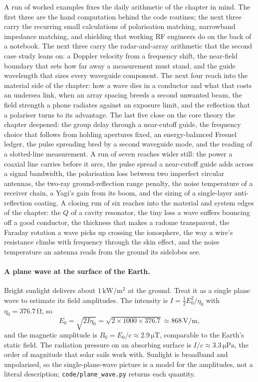 A run of worked examples fixes the daily arithmetic of the chapter in
mind. The first three are the hand computation behind the code routines;
the next three carry the recurring small calculations of polarisation
matching, narrowband impedance matching, and shielding that working RF
engineers do on the back of a notebook. The next three carry the
radar-and-array arithmetic that the second case study leans on: a
Doppler velocity from a frequency shift, the near-field boundary that
sets how far away a measurement must stand, and the guide wavelength
that sizes every waveguide component. The next four reach into the
material side of the chapter: how a wave dies in a conductor and what
that costs an undersea link, when an array spacing breeds a second
unwanted beam, the field strength a phone radiates against an exposure
limit, and the reflection that a polariser turns to its advantage. The
last five close on the core theory the chapter deepened: the group delay
through a near-cutoff guide, the frequency choice that follows from
holding apertures fixed, an energy-balanced Fresnel ledger, the pulse
spreading bred by a second waveguide mode, and the reading of a
slotted-line measurement. A run of seven reaches wider still: the
power a coaxial line carries before it arcs, the pulse spread a near-cutoff
guide adds across a signal bandwidth, the polarisation loss between two
imperfect circular antennas, the two-ray ground-reflection range penalty,
the noise temperature of a receiver chain, a Yagi's gain from its boom, and
the sizing of a single-layer anti-reflection coating. A closing run of six
reaches into the material and system edges of the chapter: the $Q$ of a
cavity resonator, the tiny loss a wave suffers bouncing off a good
conductor, the thickness that makes a radome transparent, the Faraday
rotation a wave picks up crossing the ionosphere, the way a wire's
resistance climbs with frequency through the skin effect, and the noise
temperature an antenna reads from the ground its sidelobes see.

\paragraph{A plane wave at the surface of the Earth.}
Bright sunlight delivers about $1\,\si{\kilo\watt\per\meter\squared}$ at
the ground. Treat it as a single plane wave to estimate its field
amplitudes. The intensity is $I = \tfrac{1}{2}E_{0}^{2}/\eta_{0}$ with
$\eta_{0} = 376.7\,\si{\ohm}$, so
\[
E_{0} = \sqrt{2 I \eta_{0}} = \sqrt{2\times 1000\times 376.7}
\approx 868\,\si{\volt\per\meter},
\]
and the magnetic amplitude is $B_{0} = E_{0}/c \approx 2.9\,\si{\micro
\tesla}$, comparable to the Earth's static field. The radiation pressure
on an absorbing surface is $I/c \approx 3.3\,\si{\micro\pascal}$, the
order of magnitude that solar sails work with. Sunlight is broadband and
unpolarised, so the single-plane-wave picture is a model for the
amplitudes, not a literal description; \texttt{code/plane\_wave.py}
returns each quantity.

